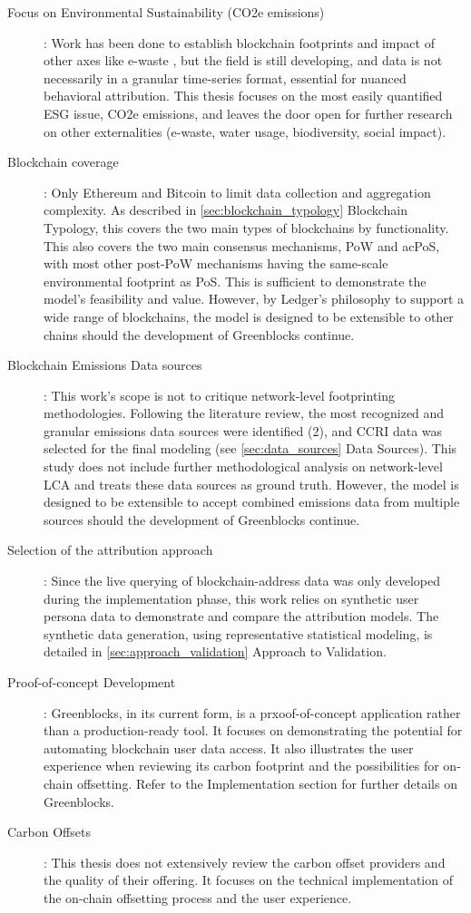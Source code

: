 \documentclass[11pt]{report}
\begin{document}
\begin{description}
    \item [Focus on Environmental Sustainability (CO2e emissions)]: Work has been done to establish blockchain footprints and impact of other axes like e-waste \cite{devriesBitcoinGrowingEwaste2021}, but the field is still developing, and data is not necessarily in a granular time-series format, essential for nuanced behavioral attribution. This thesis focuses on the most easily quantified \ac{ESG} issue, CO2e emissions, and leaves the door open for further research on other externalities (e-waste, water usage, biodiversity, social impact).
    \item [Blockchain coverage]: Only Ethereum and Bitcoin to limit data collection and aggregation complexity. As described in \ref{sec:blockchain_typology} Blockchain Typology, this covers the two main types of blockchains by functionality. This also covers the two main consensus mechanisms, \ac{PoW} and ac{PoS}, with most other post-PoW mechanisms having the same-scale environmental footprint as PoS. This is sufficient to demonstrate the model's feasibility and value. However, by Ledger's philosophy to support a wide range of blockchains, the model is designed to be extensible to other chains should the development of Greenblocks continue.
    \item [Blockchain Emissions Data sources]: This work's scope is not to critique network-level footprinting methodologies. Following the literature review, the most recognized and granular emissions data sources were identified (2), and \ac{CCRI} data was selected for the final modeling (see \ref{sec:data_sources} Data Sources). This study does not include further methodological analysis on network-level LCA and treats these data sources as ground truth. However, the model is designed to be extensible to accept combined emissions data from multiple sources should the development of Greenblocks continue.
    \item [Selection of the attribution approach]: Since the live querying of blockchain-address data was only developed during the implementation phase, this work relies on synthetic user persona data to demonstrate and compare the attribution models. The synthetic data generation, using representative statistical modeling, is detailed in \ref{sec:approach_validation} Approach to Validation.
    \item [Proof-of-concept Development]: Greenblocks, in its current form, is a prxoof-of-concept application rather than a production-ready tool. It focuses on demonstrating the potential for automating blockchain user data access. It also illustrates the user experience when reviewing its carbon footprint and the possibilities for on-chain offsetting. Refer to the Implementation section for further details on Greenblocks.
    \item [Carbon Offsets]: This thesis does not extensively review the carbon offset providers and the quality of their offering. It focuses on the technical implementation of the on-chain offsetting process and the user experience.
\end{description}
\end{document}
